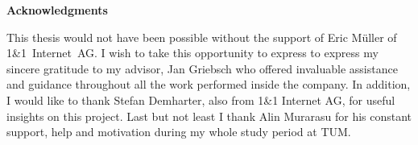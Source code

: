 \thispagestyle{empty}

\vspace*{2cm}

\begin{center}
{\Large \bf Acknowledgments}
\end{center}

\vspace{1cm}

This thesis would not have been possible without the support of Eric
M{\"u}ller of 1\&1~Internet~AG. I wish to take this opportunity to express to
express my sincere gratitude to my advisor, Jan Griebsch who offered invaluable
assistance and guidance throughout all the work performed inside the company. In
addition, I would like to thank Stefan Demharter, also from 1\&1 Internet AG,
for useful insights on this project. Last but not least I thank Alin Murarasu
for his constant support, help and motivation during my whole study period at
TUM.
